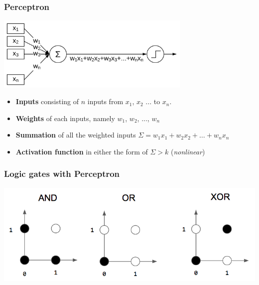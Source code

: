 \documentclass[aspectratio=169]{beamer}
\begin{document}
\begin{frame}
	\frametitle{Perceptron}
	\begin{center}
		\includegraphics[width=0.7\textwidth]{imgs/perceptron.pdf}
	\end{center}
	\begin{itemize}
		\item<2-> \textbf{Inputs} consisting of $n$ inputs from $x_1$, $x_2$ ... to $x_n$.
		\item<3-> \textbf{Weights} of each inputs, namely $w_1$, $w_2$, ..., $w_n$
		\item<4-> \textbf{Summation} of all the weighted inputs $\Sigma = w_1x_1 + w_2x_2 + \hdots + w_nx_n$
		\item<5-> \textbf{Activation function} in either the form of $\Sigma > k$ (\textit{nonlinear})
	\end{itemize}
\end{frame}

\begin{frame}
	\frametitle{Logic gates with Perceptron}
	\begin{center}
		\includegraphics[width=0.7\linewidth,height=0.7\textheight,keepaspectratio]{imgs/gates.png}
	\end{center}
\end{frame}
\end{document}
